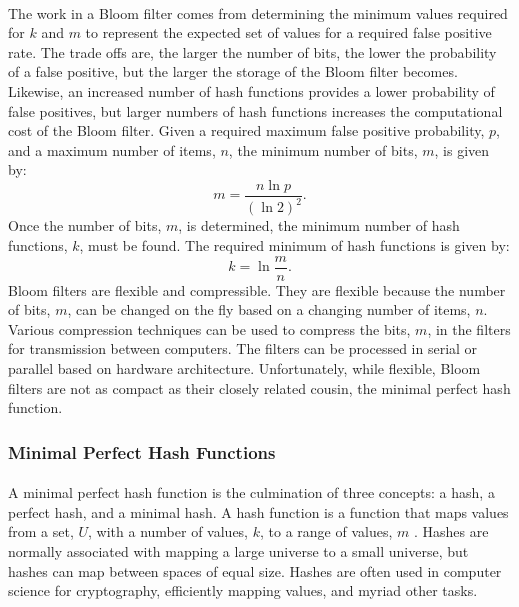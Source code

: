 			\paragraph{}The work in a Bloom filter comes from determining the minimum values required for $k$ and $m$ to represent the expected set of values for a required false positive rate. The trade offs are, the larger the number of bits, the lower the probability of a false positive, but the larger the storage of the Bloom filter becomes.  Likewise, an increased number of hash functions provides a lower probability of false positives, but larger numbers of hash functions increases the computational cost of the Bloom filter.  Given a required maximum false positive probability, $p$, and a maximum number of items, $n$, the minimum number of bits, $m$,  is given by:
			\begin{equation}m = \frac{n \ln{p}}{(\ln{2})^2}.\end{equation}
			Once the number of bits, $m$, is determined, the minimum number of hash functions, $k$, must be found.  The required minimum of hash functions is given by:
			\begin{equation} k = \ln{\frac{m}{n}}.\end{equation}
			Bloom filters are flexible and compressible.  They are flexible because the number of bits, $m$, can be changed on the fly based on a changing number of items, $n$.  Various compression techniques can be used to compress the bits, $m$, in the filters for transmission between computers.  The filters can be processed in serial or parallel based on hardware architecture.  Unfortunately, while flexible, Bloom filters are not as compact as their closely related cousin, the minimal perfect hash function.

		\subsubsection{Minimal Perfect Hash Functions}
			\paragraph{} A minimal perfect hash function is the culmination of three concepts: a hash, a perfect hash, and a minimal hash. A hash function is a function that maps values from a set, $U$, with a number of values, $k$, to a range of values, $m$ \cite{belazzougui_hash_2009}. Hashes are normally associated with mapping a large universe to a small universe, but hashes can map between spaces of equal size. Hashes are often used in computer science for cryptography, efficiently mapping values, and myriad other tasks. 
